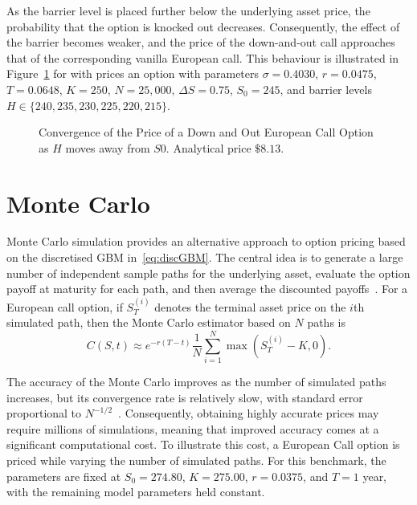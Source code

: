 \documentclass[11pt]{report}
\begin{document}
As the barrier level is placed further below the underlying 
asset price, the probability that the option is 
knocked out decreases. Consequently, the effect of the barrier 
becomes weaker, and the price of the down-and-out
call approaches that of the corresponding 
vanilla European call. This behaviour is illustrated in Figure~\ref{fig:downOutBarrier} for 
with prices an option with parameters $\sigma = 0.4030$, $r = 0.0475$, $
T = 0.0648$, $K = 250$, $N = 25{,}000$, $\Delta S = 0.75$, $S_0 = 245$,
and barrier levels $H \in \{240, 235, 230, 225, 220, 215\}$.

\begin{figure}[H]
    \centering
    
    \caption{Convergence of the Price of a Down and Out European Call Option as $H$ moves away from $S0$. Analytical price $\$8.13$.}
    \label{fig:downOutBarrier}
\end{figure}

\section{Monte Carlo}\label{sec:monteCarlo}
Monte Carlo simulation provides an alternative 
approach to option pricing based on the discretised 
GBM in~\ref{eq:discGBM}. The central idea is to generate 
a large number of independent sample paths for the 
underlying asset, evaluate the option payoff at 
maturity for each path, and then average the 
discounted payoffs~\cite{wilmott1998derivatives}. 
For a European call option, if $S_T^{(i)}$ denotes 
the terminal asset price on the $i$th simulated path, 
then the Monte Carlo estimator based on $N$ paths is
\begin{equation}
    C(S,t) \approx e^{-r(T-t)} \frac{1}{N} \sum_{i=1}^{N} \max\left(S_T^{(i)}-K,0\right).
\end{equation}

The accuracy of the Monte Carlo improves as the number of simulated paths 
increases, but its convergence rate is relatively 
slow, with standard error proportional to 
$N^{-1/2}$~\cite{alma991001559369708046}. 
Consequently, obtaining highly accurate prices
may require millions of simulations, meaning that 
improved accuracy comes at a significant computational cost.
To illustrate this cost, a European 
Call option is priced while varying the 
number of simulated paths. For this benchmark, 
the parameters are fixed at 
$S_0 = 274.80$, $K = 275.00$, $r = 0.0375$, and $T = 1$ 
year, with the remaining model parameters held constant.
\end{document}
